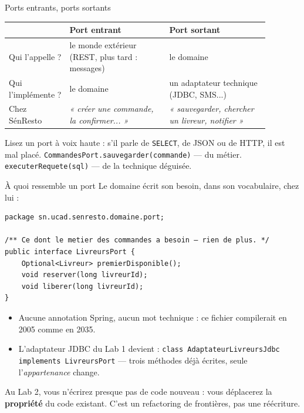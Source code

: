 \documentclass[aspectratio=169,11pt]{beamer}
\begin{document}
\begin{frame}{Ports entrants, ports sortants}
{\small\begin{tabular}{p{0.20\linewidth}p{0.34\linewidth}p{0.34\linewidth}}
\toprule
 & \textbf{Port entrant} & \textbf{Port sortant}\\
\midrule
Qui l'appelle ? & le monde extérieur (REST, plus tard : messages) & le domaine\\
\addlinespace
Qui l'implémente ? & le domaine & un adaptateur technique (JDBC, SMS...)\\
\addlinespace
Chez SénResto & \emph{« créer une commande, la confirmer... »} & \emph{« sauvegarder, chercher un livreur, notifier »}\\
\bottomrule
\end{tabular}}
\vskip4pt
\begin{ucadex}
{\small Lisez un port à voix haute : s'il parle de \texttt{SELECT}, de JSON ou de HTTP, il est mal placé. \texttt{CommandesPort.sauvegarder(commande)} — du métier. \texttt{executerRequete(sql)} — de la technique déguisée.}
\end{ucadex}
\end{frame}

\begin{frame}[fragile]{À quoi ressemble un port}
{\small Le domaine écrit son besoin, dans son vocabulaire, chez lui :}
\begin{lstlisting}
package sn.ucad.senresto.domaine.port;

/** Ce dont le metier des commandes a besoin — rien de plus. */
public interface LivreursPort {
    Optional<Livreur> premierDisponible();
    void reserver(long livreurId);
    void liberer(long livreurId);
}
\end{lstlisting}
\begin{itemize}\small
  \item Aucune annotation Spring, aucun mot technique : ce fichier compilerait en 2005 comme en 2035.
  \item L'adaptateur JDBC du Lab 1 devient : \texttt{class AdaptateurLivreursJdbc implements LivreursPort} — trois méthodes déjà écrites, seule l'\emph{appartenance} change.
\end{itemize}
\begin{ucadret}[À retenir]
{\small Au Lab 2, vous n'écrirez presque pas de code nouveau : vous déplacerez la \textbf{propriété} du code existant. C'est un refactoring de frontières, pas une réécriture.}
\end{ucadret}
\end{frame}
\end{document}
